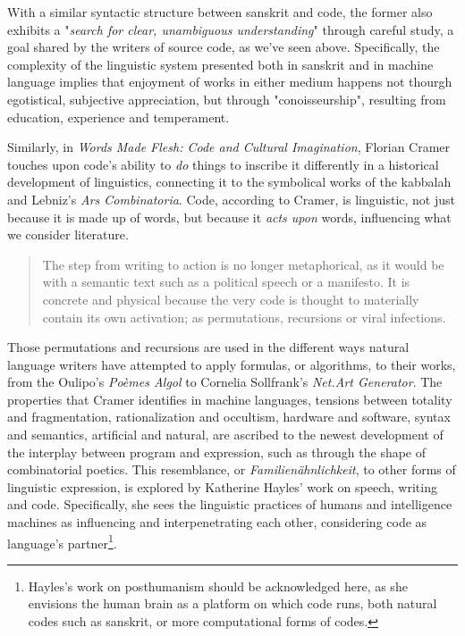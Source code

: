 With a similar syntactic structure between sanskrit and code, the former also exhibits a "\emph{search for clear, unambiguous understanding}" through careful study, a goal shared by the writers of source code, as we've seen above. Specifically, the complexity of the linguistic system presented both in sanskrit and in machine language implies that enjoyment of works in either medium happens not thourgh egotistical, subjective appreciation, but through "conoisseurship", resulting from education, experience and temperament\cite{chandra_geek_2014}.

Similarly, in \emph{Words Made Flesh: Code and Cultural Imagination}, Florian Cramer touches upon code's ability to \emph{do} things to inscribe it differently in a historical development of linguistics, connecting it to the symbolical works of the kabbalah and Lebniz's \emph{Ars Combinatoria}. Code, according to Cramer, is linguistic, not just because it is made up of words, but because it \emph{acts upon} words, influencing what we consider literature.

\begin{quote}
  The step from writing to action is no longer metaphorical, as it would be with a semantic text such as a political speech or a manifesto. It is concrete and physical because the very code is thought to materially contain its own activation; as permutations, recursions or viral infections.\cite{cramer_words_2003}
\end{quote}

Those permutations and recursions are used in the different ways natural language writers have attempted to apply formulas, or algorithms, to their works, from the Oulipo's \emph{Poèmes Algol} to Cornelia Sollfrank's \emph{Net.Art Generator}. The properties that Cramer identifies in machine languages, tensions between totality and fragmentation, rationalization and occultism, hardware and software, syntax and semantics, artificial and natural, are ascribed to the newest development of the interplay between program and expression, such as through the shape of combinatorial poetics\cite{cramer_words_2003}. This resemblance, or \emph{Familienähnlichkeit}, to other forms of linguistic expression, is explored by Katherine Hayles' work on speech, writing and code. Specifically, she sees the linguistic practices of humans and intelligence machines as influencing and interpenetrating each other, considering code as language's partner\footnote{Hayles's work on posthumanism should be acknowledged here, as she envisions the human brain as a platform on which code runs, both natural codes such as sanskrit, or more computational forms of codes.}.

